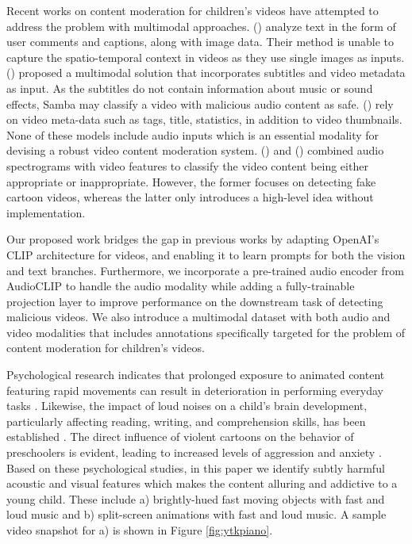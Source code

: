 \documentclass[letterpaper]{article}
\begin{document}
Recent works on content moderation for children's videos have attempted to address the problem with multimodal approaches. \citeauthor{chuttur} (\citeyear{chuttur}) analyze text in the form of user comments and captions, along with image data. Their method is unable to capture the spatio-temporal context in videos as they use single images as inputs. \citeauthor{samba} (\citeyear{samba}) proposed a multimodal solution that incorporates subtitles and video metadata as input. As the subtitles do not contain information about music or sound effects, Samba may classify a video with malicious audio content as safe. \citeauthor{Papadamou} (\citeyear{Papadamou}) rely on video meta-data such as tags, title, statistics, in addition to video thumbnails. None of these models include audio inputs which is an essential modality for devising a robust video content moderation system. \citeauthor{tahir_audio} 
 (\citeyear{tahir_audio}) and \citeauthor{algh_audio} (\citeyear{algh_audio}) combined audio spectrograms with video features to classify the video content being either appropriate or inappropriate. However, the former focuses on detecting fake cartoon videos, whereas the latter only introduces a high-level idea without implementation.  %

Our proposed work bridges the gap in previous works by adapting OpenAI's CLIP architecture \cite{vanilla_clip} for videos, and enabling it to learn prompts for both the vision and text branches. Furthermore, we incorporate a pre-trained audio encoder from AudioCLIP \cite{audio_clip} to handle the audio modality while adding a fully-trainable projection layer to improve performance on the downstream task of detecting malicious videos. We also introduce a multimodal dataset with both audio and video modalities that includes annotations specifically targeted for the problem of content moderation for children's videos.

Psychological research indicates that prolonged exposure to animated content featuring rapid movements can result in deterioration in performing everyday tasks \cite{fast_motion_psycho}. Likewise, the impact of loud noises on a child's brain development, particularly affecting reading, writing, and comprehension skills, has been established \cite{loud_noise_psycho}. The direct influence of violent cartoons on the behavior of preschoolers is evident, leading to increased levels of aggression and anxiety \cite{violent_cartoons_psycho}. Based on these psychological studies, in this paper we identify subtly harmful acoustic and visual features which makes the content alluring and addictive to a young child. These include a) brightly-hued fast moving objects with fast and loud music and b) split-screen animations with fast and loud music. A sample video snapshot for a) is shown in Figure \ref{fig:ytkpiano}.
\end{document}
